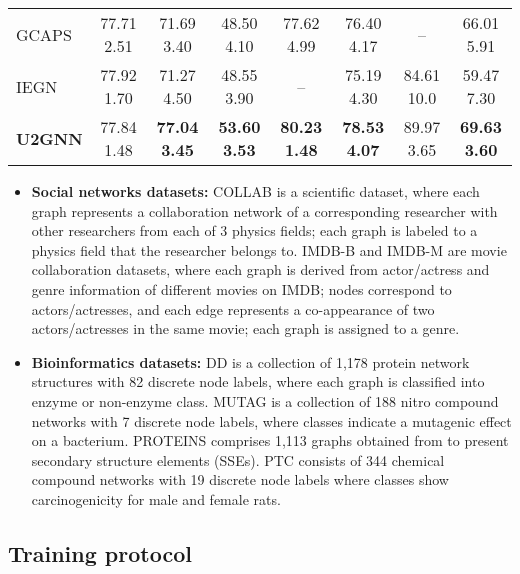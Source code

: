 \documentclass[twoside,leqno,twocolumn]{article}
\newcommand{\citep}{\cite}
\newcommand{\citeyearpar}{\cite}
\begin{document}
\begin{table*}[!ht]
{\begin{tabular}{l|c|c|c|c|c|c|c}
GCAPS \citeyearpar{verma2018graph} & 77.71  2.51 & 71.69  3.40 & 48.50  4.10 & 77.62  4.99 & 76.40  4.17 & -- & 66.01  5.91\\
IEGN \citeyearpar{maron2019invariant} & 77.92  1.70 & 71.27  4.50 & 48.55  3.90 & -- & 75.19  4.30 & 84.61  10.0 & 59.47  7.30 \\
\hline
\textbf{U2GNN} & 77.84  1.48 & \textbf{77.04  3.45} & \textbf{53.60  3.53} & \textbf{80.23  1.48} & \textbf{78.53  4.07} & 89.97  3.65 & \textbf{69.63  3.60}\\
\hline
\end{tabular}
}
\label{tab:expresult_sup}
\end{table*}

\begin{itemize}

\item \textbf{Social networks datasets:} COLLAB is a scientific dataset, where each graph represents a collaboration network of a corresponding researcher with other researchers from each of 3 physics fields; each graph is labeled to a physics field that the researcher belongs to.
IMDB-B and IMDB-M are movie collaboration datasets, where each graph is derived from actor/actress and genre information of different movies on IMDB; nodes correspond to actors/actresses, and each edge represents a co-appearance of two actors/actresses in the same movie; each graph is assigned to a genre.


\item \textbf{Bioinformatics datasets:} DD \citep{dobson2003distinguishingDD} is a collection of 1,178 protein network structures with 82 discrete node labels, where each graph is classified into enzyme or non-enzyme class.
MUTAG \citep{debnath1991structureMUTAG} is a collection of 188 nitro compound networks with 7 discrete node labels, where classes indicate a mutagenic effect on a bacterium.
PROTEINS comprises 1,113 graphs obtained from \citep{borgwardt2005PROTEINENZYMES} to present secondary structure elements (SSEs). 
PTC \citep{toivonen2003statisticalPTC} consists of 344 chemical compound networks with 19 discrete node labels where classes show carcinogenicity for male and female rats.

\end{itemize}



\subsection{Training protocol}
\label{subsec:training}
\end{document}
